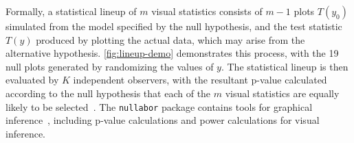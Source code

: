 \documentclass[letterpaper]{ar-1col}\usepackage[]{graphicx}\usepackage[]{color}
\newenvironment{knitrout}{}{} %
\begin{document}
Formally, a statistical lineup of $m$ visual statistics consists of $m-1$ plots $T(y_0)$ simulated from the model specified by the null hypothesis, and the test statistic $T(y)$ produced by plotting the actual data, which may arise from the alternative hypothesis. \autoref{fig:lineup-demo} demonstrates this process, with the 19 null plots generated by randomizing the values of $y$. The statistical lineup is then evaluated by $K$ independent observers, with the resultant p-value calculated according to the null hypothesis that each of the $m$ visual statistics are equally likely to be selected~\citep{majumderValidationVisualStatistical2013}. The \texttt{nullabor} package contains tools for graphical inference~\citep{nullabor}, including p-value calculations and power calculations for visual inference.

\begin{figure}
\begin{minipage}{.3\textwidth}
\begin{knitrout}
\color{fgcolor}

\end{knitrout}
\end{minipage}
\end{figure}
\end{document}
